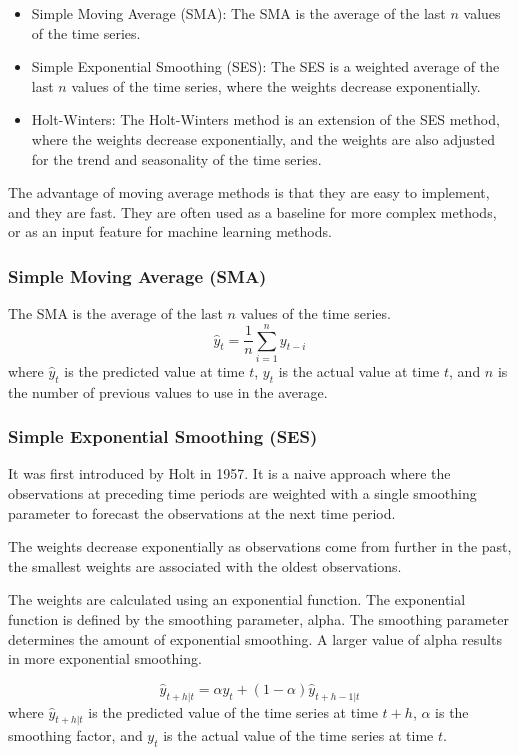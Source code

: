 \documentclass[manuscript,screen,nonacm,11pt]{acmart}                                                          %
\numberwithin{equation}{section}
\begin{document}
\begin{itemize}
\item Simple Moving Average (SMA): The SMA is the average of the last $n$ values of the time series.
\item Simple Exponential Smoothing (SES): The SES is a weighted average of  the last $n$ values of the time series, where the weights decrease exponentially.
\item Holt-Winters: The Holt-Winters method is an extension of the SES method, where the weights decrease exponentially, and the weights are also adjusted for the trend and seasonality of the time series.
\end{itemize}

The advantage of moving average methods is that they are easy to implement, and they are fast. 
They are often used as a baseline for more complex methods, or as an input feature for machine learning methods.

\subsubsection{Simple Moving Average (SMA)}
The SMA is the average of the last $n$ values of the time series.
\begin{equation}
\label{eq:sma}
\hat{y}_{t} = \frac{1}{n} \sum_{i=1}^{n} y_{t-i}
\end{equation}
where $\hat{y}_{t}$ is the predicted value at time $t$, $y_{t}$ is the actual value at time $t$, and $n$ is the number of previous values to use in the average.


\subsubsection{Simple Exponential Smoothing (SES)}
It was first introduced by Holt in 1957. It is a naive approach where the observations at
preceding time periods are weighted with a single smoothing parameter to forecast the
observations at the next time period.

The weights decrease exponentially as observations come from further in the past,
the smallest weights are associated with the oldest observations.

The weights are calculated using an exponential function. The exponential function is defined by
the smoothing parameter, alpha. The smoothing parameter determines the amount of exponential
smoothing. A larger value of alpha results in more exponential smoothing.

\begin{equation}
\label{eq:ses}
\hat{y}_{t+h|t} = \alpha y_t + (1-\alpha)\hat{y}_{t+h-1|t}
\end{equation}
where $\hat{y}_{t+h|t}$ is the predicted value of the time series at time $t+h$,
$\alpha$ is the smoothing factor, and $y_t$ is the actual value of the time series
at time $t$.
\end{document}

